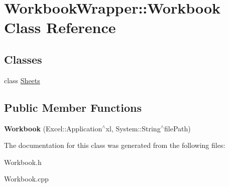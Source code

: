 \hypertarget{class_workbook_wrapper_1_1_workbook}{}\section{Workbook\+Wrapper\+:\+:Workbook Class Reference}
\label{class_workbook_wrapper_1_1_workbook}
\subsection*{Classes}
\begin{DoxyCompactItemize}
\item 
class \hyperlink{class_workbook_wrapper_1_1_workbook_1_1_sheets}{Sheets}
\end{DoxyCompactItemize}
\subsection*{Public Member Functions}
\begin{DoxyCompactItemize}
\item 
\hypertarget{class_workbook_wrapper_1_1_workbook_a3c912e843627d6fde920e313d16047e1}{}{\bfseries Workbook} (Excel\+::\+Application$^\wedge$xl, System\+::\+String$^\wedge$file\+Path)\label{class_workbook_wrapper_1_1_workbook_a3c912e843627d6fde920e313d16047e1}

\end{DoxyCompactItemize}


The documentation for this class was generated from the following files\+:\begin{DoxyCompactItemize}
\item 
Workbook.\+h\item 
Workbook.\+cpp\end{DoxyCompactItemize}
